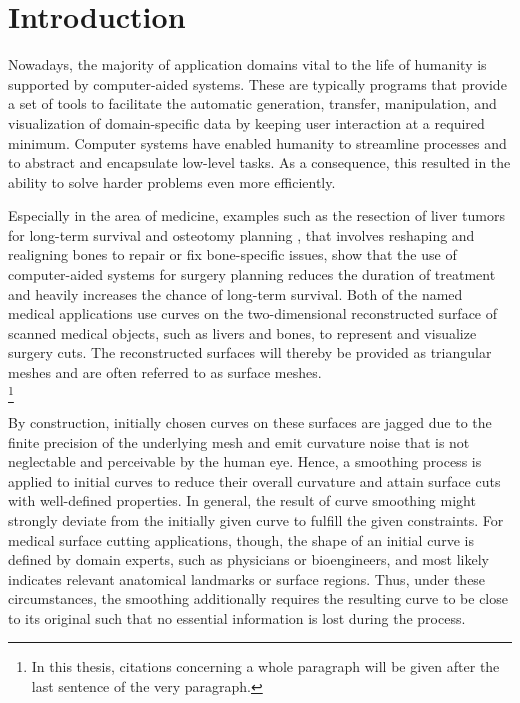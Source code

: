 \documentclass{stdlocal}
\begin{document}
\section{Introduction} %
\label{sec:introduction}

Nowadays, the majority of application domains vital to the life of humanity is supported by computer-aided systems.
These are typically programs that provide a set of tools to facilitate the automatic generation, transfer, manipulation, and visualization of domain-specific data by keeping user interaction at a required minimum.
Computer systems have enabled humanity to streamline processes and to abstract and encapsulate low-level tasks.
As a consequence, this resulted in the ability to solve harder problems even more efficiently.

Especially in the area of medicine, examples such as the resection of liver tumors for long-term survival \autocite{alirr2019} and osteotomy planning \autocite{zachow2003}, that involves reshaping and realigning bones to repair or fix bone-specific issues, show that the use of computer-aided systems for surgery planning reduces the duration of treatment and heavily increases the chance of long-term survival.
Both of the named medical applications use curves on the two-dimensional reconstructed surface of scanned medical objects, such as livers and bones, to represent and visualize surgery cuts.
The reconstructed surfaces will thereby be provided as triangular meshes and are often referred to as surface meshes. \\
\autocite{zachow2003,alirr2019}\footnote{In this thesis, citations concerning a whole paragraph will be given after the last sentence of the very paragraph.}

By construction, initially chosen curves on these surfaces are jagged due to the finite precision of the underlying mesh and emit curvature noise that is not neglectable and perceivable by the human eye.
Hence, a smoothing process is applied to initial curves to reduce their overall curvature and attain surface cuts with well-defined properties.
In general, the result of curve smoothing might strongly deviate from the initially given curve to fulfill the given constraints.
For medical surface cutting applications, though, the shape of an initial curve is defined by domain experts, such as physicians or bioengineers, and most likely indicates relevant anatomical landmarks or surface regions.
Thus, under these circumstances, the smoothing additionally requires the resulting curve to be close to its original such that no essential information is lost during the process.
\autocite{lawonn2014}
\end{document}
